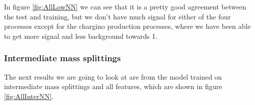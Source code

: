 In figure \ref{fig:AllLowNN} we can see that it is a pretty good agreement between the test and training, but we don't have much signal for either of the four processes except for the chargino production processes, where we have been able to get more signal and less background towards 1.  













\subsubsection{Intermediate mass splittings}


The next results we are going to look at are from the model trained on intermediate mass splittings and all features, which are shown in figure \ref{fig:AllInterNN}.



